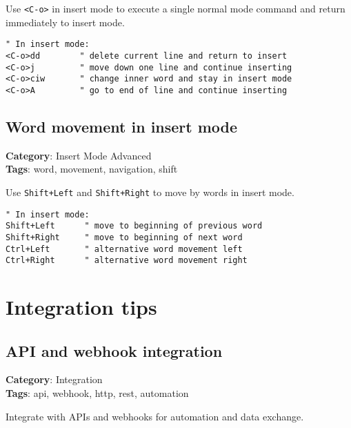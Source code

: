 {{{{{Use {\footnotesize \Verb§<C-o>§} in insert mode to execute a single normal mode command and return immediately to insert mode.

\begin{Exa*}{}
\begin{Verbatim}[fontsize=\footnotesize, breaklines, breakanywhere]
" In insert mode:
<C-o>dd        " delete current line and return to insert
<C-o>j         " move down one line and continue inserting
<C-o>ciw       " change inner word and stay in insert mode
<C-o>A         " go to end of line and continue inserting
\end{Verbatim}
\end{Exa*}

\section{Word movement in insert mode}

\textbf{Category}: Insert Mode Advanced\\ \textbf{Tags}: word, movement, navigation, shift
\vspace{0.5cm}

Use {\footnotesize \Verb§Shift+Left§} and {\footnotesize \Verb§Shift+Right§} to move by words in insert mode.

\begin{Exa*}{}
\begin{Verbatim}[fontsize=\footnotesize, breaklines, breakanywhere]
" In insert mode:
Shift+Left      " move to beginning of previous word
Shift+Right     " move to beginning of next word
Ctrl+Left       " alternative word movement left
Ctrl+Right      " alternative word movement right
\end{Verbatim}
\end{Exa*}

\chapter{Integration tips}
\section{API and webhook integration}

\textbf{Category}: Integration\\ \textbf{Tags}: api, webhook, http, rest, automation
\vspace{0.5cm}

Integrate with APIs and webhooks for automation and data exchange.

}}}}}
